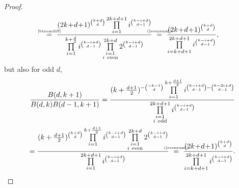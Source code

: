 \documentclass{amsart}
\newcommand{\myeq}[1]{\mathrel{\overset{\makebox[0pt]{\text{\tiny #1}}}{=}}}
\theoremstyle{plain}
\theoremstyle{definition}
\theoremstyle{remark}
\begin{document}
\begin{proof}
\begin{gather*}
\myeq{\ref{binomdiff}}\ \frac{ (2k\!+\!d\!+\!1)^{\binom{k+d}{d}}  \prod\limits_{i=1}^{2k+d+1}i^{\binom{k-i+d}{d-1}}  }{ \prod\limits_{i=1}^{k+\frac{d}{2}} i^{\binom{k-i+d}{d-1}} \prod\limits_{\substack{i=1 \\ i\ \text{even} }}^{2k+d} 2^{ \binom{k-i+d}{d-1}} } 
\ \myeq{(\ref{evensum})} \ \frac{ (2k\!+\!d\!+\!1)^{\binom{k+d}{d}} }{ \prod\limits_{i=k+d+1}^{2k+d+1}i^{ \binom{k-i+d}{d-1}} },
\end{gather*}
but also for odd $d$,
\begin{gather*}
\frac{B(d,k+1)}{B(d,k)B(d-1,k+1)} = \frac{ (k+\tfrac{d+1}{2})^{-\binom{-k-1}{d}} \prod\limits_{i=1}^{k+\frac{d+1}{2}} i^{\binom{k-i+d}{d-1}-\binom{k-2i+d}{d-1}}  }{ \prod\limits_{\substack{i=1 \\ i\ \text{odd} }}^{2k+d+1}i^{\binom{k-i+d}{d-1}} } \\
= \frac{ (k+\tfrac{d+1}{2})^{\binom{k+d}{d}} \prod\limits_{i=1}^{k+\frac{d+1}{2}} i^{\binom{k-i+d}{d-1}}  \prod\limits_{\substack{i=1 \\ i\ \text{even} }}^{2k+d} 2^{ \binom{k-i+d}{d-1}}}{ \prod\limits_{i=1}^{2k+d+1}i^{\binom{k-i+d}{d-1}}} 
\ \myeq{(\ref{evensum})} \ \frac{ (2k\!+\!d\!+\!1)^{\binom{k+d}{d}} }{ \prod\limits_{i=k+d+1}^{2k+d+1}i^{ \binom{k-i+d}{d-1}} }.
\end{gather*}
\end{proof}
\end{document}
